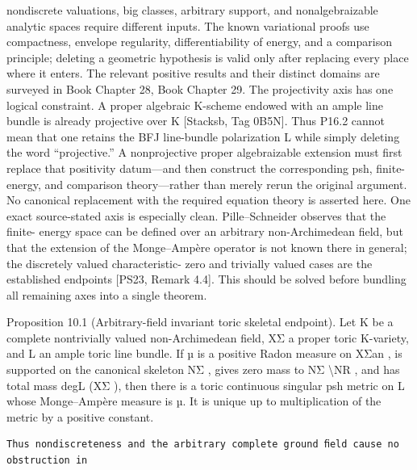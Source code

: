 \documentclass[
  10pt,
]{article}
\begin{document}
nondiscrete valuations, big classes, arbitrary support, and
nonalgebraizable analytic spaces require diﬀerent inputs. The known
variational proofs use compactness, envelope regularity,
diﬀerentiability of energy, and a comparison principle; deleting a
geometric hypothesis is valid only after replacing every place where it
enters. The relevant positive results and their distinct domains are
surveyed in Book Chapter 28, Book Chapter 29. The projectivity axis has
one logical constraint. A proper algebraic K-scheme endowed with an
ample line bundle is already projective over K {[}Stacksb, Tag 0B5N{]}.
Thus P16.2 cannot mean that one retains the BFJ line-bundle polarization
L while simply deleting the word ``projective.'' A nonprojective proper
algebraizable extension must ﬁrst replace that positivity datum---and
then construct the corresponding psh, ﬁnite-energy, and comparison
theory---rather than merely rerun the original argument. No canonical
replacement with the required equation theory is asserted here. One
exact source-stated axis is especially clean. Pille--Schneider observes
that the ﬁnite- energy space can be deﬁned over an arbitrary
non-Archimedean ﬁeld, but that the extension of the Monge--Ampère
operator is not known there in general; the discretely valued
characteristic- zero and trivially valued cases are the established
endpoints {[}PS23, Remark 4.4{]}. This should be solved before bundling
all remaining axes into a single theorem.

Proposition 10.1 (Arbitrary-ﬁeld invariant toric skeletal endpoint). Let
K be a complete nontrivially valued non-Archimedean ﬁeld, XΣ a proper
toric K-variety, and L an ample toric line bundle. If µ is a positive
Radon measure on XΣan , is supported on the canonical skeleton NΣ ,
gives zero mass to NΣ \textbackslash NR , and has total mass degL (XΣ ),
then there is a toric continuous singular psh metric on L whose
Monge--Ampère measure is µ. It is unique up to multiplication of the
metric by a positive constant.

\begin{verbatim}
Thus nondiscreteness and the arbitrary complete ground ﬁeld cause no obstruction in
\end{verbatim}
\end{document}
